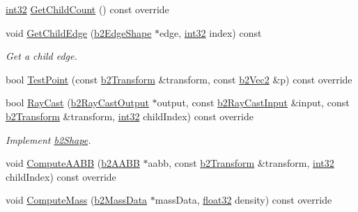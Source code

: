 \begin{DoxyCompactItemize}
\mbox{\hyperlink{b2_settings_8h_a43d43196463bde49cb067f5c20ab8481}{int32}} \mbox{\hyperlink{classb2_chain_shape_a4d4fd8f5386a30f35b10d1b2848dbe54}{Get\+Child\+Count}} () const override
\item 
void \mbox{\hyperlink{classb2_chain_shape_abfe7f836d3c32dc06b920df61a74f412}{Get\+Child\+Edge}} (\mbox{\hyperlink{classb2_edge_shape}{b2\+Edge\+Shape}} $\ast$edge, \mbox{\hyperlink{b2_settings_8h_a43d43196463bde49cb067f5c20ab8481}{int32}} index) const
\begin{DoxyCompactList}\small\item\em Get a child edge. \end{DoxyCompactList}\item 
bool \mbox{\hyperlink{classb2_chain_shape_afd03c8679f18f9962a6c76bde629c62a}{Test\+Point}} (const \mbox{\hyperlink{structb2_transform}{b2\+Transform}} \&transform, const \mbox{\hyperlink{structb2_vec2}{b2\+Vec2}} \&p) const override
\item 
bool \mbox{\hyperlink{classb2_chain_shape_add9e88f7f90b32ae75738cfb042ef532}{Ray\+Cast}} (\mbox{\hyperlink{structb2_ray_cast_output}{b2\+Ray\+Cast\+Output}} $\ast$output, const \mbox{\hyperlink{structb2_ray_cast_input}{b2\+Ray\+Cast\+Input}} \&input, const \mbox{\hyperlink{structb2_transform}{b2\+Transform}} \&transform, \mbox{\hyperlink{b2_settings_8h_a43d43196463bde49cb067f5c20ab8481}{int32}} child\+Index) const override
\begin{DoxyCompactList}\small\item\em Implement \mbox{\hyperlink{classb2_shape}{b2\+Shape}}. \end{DoxyCompactList}\item 
void \mbox{\hyperlink{classb2_chain_shape_ae1d7470ce8d32e92d27c149ab45f5468}{Compute\+A\+A\+BB}} (\mbox{\hyperlink{structb2_a_a_b_b}{b2\+A\+A\+BB}} $\ast$aabb, const \mbox{\hyperlink{structb2_transform}{b2\+Transform}} \&transform, \mbox{\hyperlink{b2_settings_8h_a43d43196463bde49cb067f5c20ab8481}{int32}} child\+Index) const override
\item 
void \mbox{\hyperlink{classb2_chain_shape_aad3671d6eab61f6b26e2f1b6ac50bb98}{Compute\+Mass}} (\mbox{\hyperlink{structb2_mass_data}{b2\+Mass\+Data}} $\ast$mass\+Data, \mbox{\hyperlink{b2_settings_8h_aacdc525d6f7bddb3ae95d5c311bd06a1}{float32}} density) const override
\end{DoxyCompactItemize}
